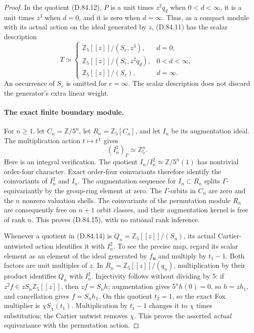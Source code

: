 \begin{proof}
In the quotient (D.84.12), \(P\) is a unit times
\(z^2q_d\) when \(0<d<\infty\), it is a unit times
\(z^3\) when \(d=0\), and it is zero when \(d=\infty\).
Thus, as a compact module with its actual action on the
ideal generated by \(z\), (D.84.11) has the scalar description
\[
 T\simeq
 \begin{cases}
  \mathbb Z_5[[z]]/(S_e,z^3),&d=0,\\
  \mathbb Z_5[[z]]/(S_e,z^2q_d),&0<d<\infty,\\
  \mathbb Z_5[[z]]/(S_e),&d=\infty.
 \end{cases}                                                     \tag{D.84.14}
\]
An occurrence of \(S_e\) is omitted for \(e=\infty\).
The scalar description does not discard the generator's
extra linear weight.

\paragraph{The exact finite boundary module.}
For \(n\ge1\), let
\(C_n=\mathbb Z/5^n\), let \(R_n=\mathbb Z_5[C_n]\),
and let \(I_n\) be its augmentation ideal. The multiplication
action \(t\mapsto t^\chi\) gives
\[
                        (I_n^2)_\Gamma\simeq\mathbb Z_5^n.
                                                                  \tag{D.84.15}
\]
Here is an integral verification. The quotient
\(I_n/I_n^2\simeq\mathbb Z/5^n(1)\) has nontrivial
order-four character. Exact order-four coinvariants therefore
identify the coinvariants of \(I_n^2\) and \(I_n\).
The augmentation sequence for \(I_n\subset R_n\) splits
\(\Gamma\)-equivariantly by the group-ring element at zero.
The \(\Gamma\)-orbits in \(C_n\) are zero and the \(n\)
nonzero valuation shells. The coinvariants of the permutation
module \(R_n\) are consequently free on \(n+1\) orbit classes,
and their augmentation kernel is free of rank \(n\).
This proves (D.84.15), with no rational rank inference.

Whenever a quotient in (D.84.14) is
\(Q_n=\mathbb Z_5[[z]]/(S_n)\), its actual Cartier-untwisted
action identifies it with \(I_n^2\). To see the precise map,
regard its scalar element as an element of the ideal generated
by \(f_{\mathbf u}\) and multiply by \(t_1-1\).
Both factors are unit multiples of \(z\). In
\(R_n=\mathbb Z_5[[z]]/(q_n)\), multiplication by their
product identifies \(Q_n\) with \(I_n^2\).
Injectivity follows without dividing by \(5\): if
\(z^2f\in zS_n\mathbb Z_5[[z]]\), then
\(zf=S_nh\); augmentation gives \(5^nh(0)=0\), so
\(h=zh_1\), and cancellation gives \(f=S_nh_1\).
On this quotient \(t_2=1\), so the exact Fox multiplier
is \(\chi S_\chi(t_1)\). Multiplication by \(t_1-1\)
changes it to \(\chi\) times substitution; the Cartier
untwist removes \(\chi\). This proves the asserted
\emph{actual} equivariance with the permutation action.


\end{proof}
